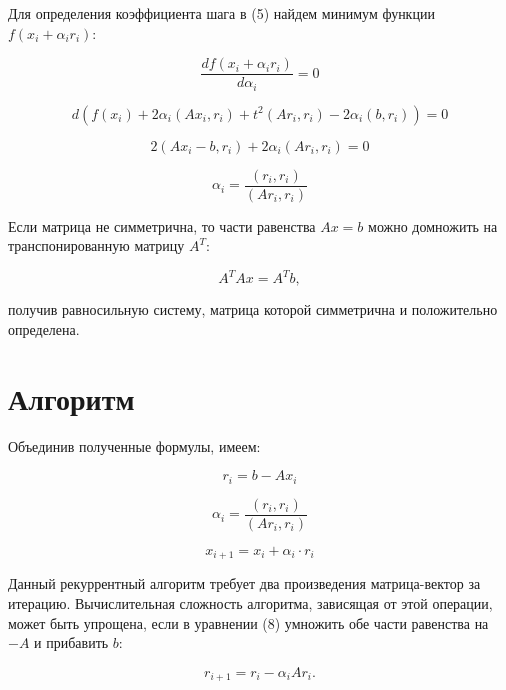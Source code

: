\documentclass{article}
\begin{document}
Для определения коэффициента шага в (5) найдем минимум функции $f(x_i + \alpha_i r_i)$:

\begin{equation*}
    \frac{df(x_i + \alpha_i r_i)}{d\alpha_i} = 0
\end{equation*}

\begin{equation*}
    d(f(x_i) + 2\alpha_i (A x_i, r_i) + t^2 (A r_i, r_i) - 2 \alpha_i (b, r_i)) = 0
\end{equation*}

\begin{equation*}
    2(A x_i - b, r_i) + 2 \alpha_i (A r_i, r_i) = 0    
\end{equation*}

\begin{equation*}
    \alpha_i = \frac{(r_i, r_i)}{(A r_i, r_i)}
\end{equation*}

Если матрица не симметрична, то части равенства $Ax = b$ можно домножить на транспонированную матрицу $A^T$:

\begin{equation*}
    A^T A x = A^T b,
\end{equation*}

получив равносильную систему, матрица которой симметрична и положительно определена.

\section{Алгоритм}

Объединив полученные формулы, имеем:

\begin{equation}
    r_i = b - Ax_i
\end{equation}

\begin{equation}
    \alpha_i = \frac{(r_i, r_i)}{(A r_i, r_i)}
\end{equation}

\begin{equation}
    x_{i + 1} = x_i + \alpha_i \cdot r_i
\end{equation}

Данный рекуррентный алгоритм требует два произведения матрица-вектор за итерацию. Вычислительная сложность алгоритма, зависящая от этой 
операции, может быть упрощена, если в уравнении (8) умножить обе части равенства на $-A$ и прибавить $b$:

\begin{equation}
    r_{i + 1} = r_i - \alpha_i A r_i.
\end{equation}
\end{document}
